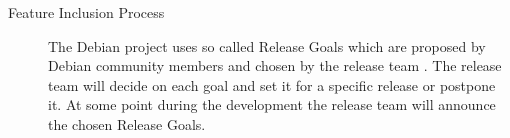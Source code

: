 \begin{description}
\begin{description}
    \item[Feature Inclusion Process] The Debian project uses so called Release
      Goals which are proposed by Debian community members and chosen by the
      release team \cite{DebianReleaseGoals,McGovern2011}. The release team
      will decide on each goal and set it for a specific release or postpone
      it. At some point during the development the release team will announce
      the chosen Release Goals.

  \end{description}

\end{description}



